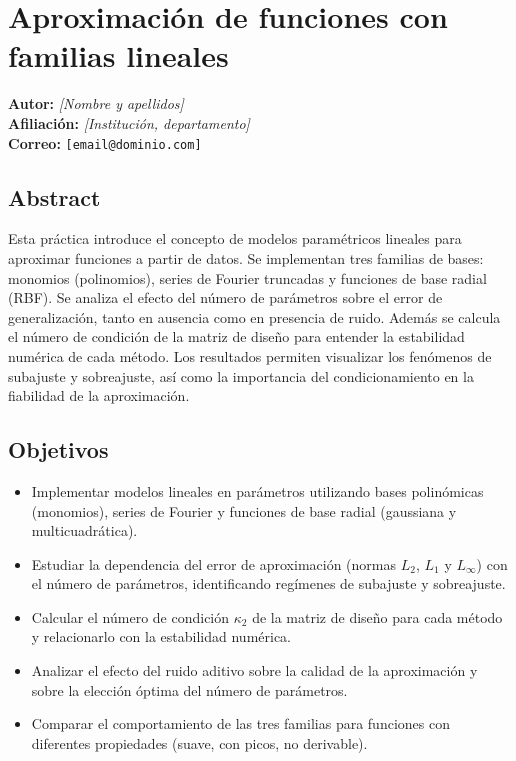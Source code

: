 \chapter{Aproximación de funciones con familias lineales}
\label{chap:aproximacion_lineal}

\begin{tcolorbox}[
  colframe=CtpLavender,
  colback=CtpLavender!0,
  arc=0.5pt,
  boxrule=0.5pt,
  left=6pt,
  right=6pt,
  top=6pt,
  bottom=6pt,
  fontupper=\small
]
\noindent
\textcolor{CtpMauve}{\textbf{Autor:}} \textit{[Nombre y apellidos]}\\[2pt]
\textcolor{CtpMauve}{\textbf{Afiliación:}} \textit{[Institución, departamento]}\\[2pt]
\textcolor{CtpMauve}{\textbf{Correo:}} \texttt{[email@dominio.com]}
\end{tcolorbox}

\section{Abstract}
Esta práctica introduce el concepto de modelos paramétricos lineales para aproximar funciones a partir de datos. Se implementan tres familias de bases: monomios (polinomios), series de Fourier truncadas y funciones de base radial (RBF). Se analiza el efecto del número de parámetros sobre el error de generalización, tanto en ausencia como en presencia de ruido. Además se calcula el número de condición de la matriz de diseño para entender la estabilidad numérica de cada método. Los resultados permiten visualizar los fenómenos de subajuste y sobreajuste, así como la importancia del condicionamiento en la fiabilidad de la aproximación.

\section{Objetivos}
\begin{itemize}
  \item Implementar modelos lineales en parámetros utilizando bases polinómicas (monomios), series de Fourier y funciones de base radial (gaussiana y multicuadrática).
  \item Estudiar la dependencia del error de aproximación (normas \(L_2\), \(L_1\) y \(L_\infty\)) con el número de parámetros, identificando regímenes de subajuste y sobreajuste.
  \item Calcular el número de condición \(\kappa_2\) de la matriz de diseño para cada método y relacionarlo con la estabilidad numérica.
  \item Analizar el efecto del ruido aditivo sobre la calidad de la aproximación y sobre la elección óptima del número de parámetros.
  \item Comparar el comportamiento de las tres familias para funciones con diferentes propiedades (suave, con picos, no derivable).
\end{itemize}

